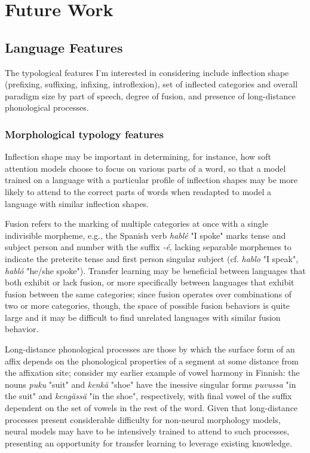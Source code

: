 \chapter{Future Work}

\section{Language Features}

The typological features I'm interested in considering include inflection shape (prefixing, suffixing, infixing, introflexion), set of inflected categories and overall paradigm size by part of speech, degree of fusion, and presence of long-distance phonological processes. 

\subsection{Morphological typology features}

Inflection shape may be important in determining, for instance, how soft attention models choose to focus on various parts of a word, so that a model trained on a language with a particular profile of inflection shapes may be more likely to attend to the correct parts of words when readapted to model a language with similar inflection shapes. 

Fusion refers to the marking of multiple categories at once with a single indivisible morpheme, e.g., the Spanish verb \textit{hablé} "I spoke" marks tense and subject person and number with the suffix \textit{-é}, lacking separable morphemes to indicate the preterite tense and first person singular subject (cf. \textit{hablo} "I speak", \textit{habló} "he/she spoke"). Transfer learning may be beneficial between languages that both exhibit or lack fusion, or more specifically between languages that exhibit fusion between the same categories; since fusion operates over combinations of two or more categories, though, the space of possible fusion behaviors is quite large and it may be difficult to find unrelated languages with similar fusion behavior. 

Long-distance phonological processes are those by which the surface form of an affix depends on the phonological properties of a segment at some distance from the affixation site; consider my earlier example of vowel harmony in Finnish: the nouns \textit{puku} "suit" and \textit{kenkä} "shoe" have the inessive singular forms \textit{puvussa} "in the suit" and \textit{kengässä} "in the shoe", respectively, with final vowel of the suffix dependent on the set of vowels in the rest of the word. Given that long-distance processes present considerable difficulty for non-neural morphology models, neural models may have to be intensively trained to attend to such processes, presenting an opportunity for transfer learning to leverage existing knowledge.


